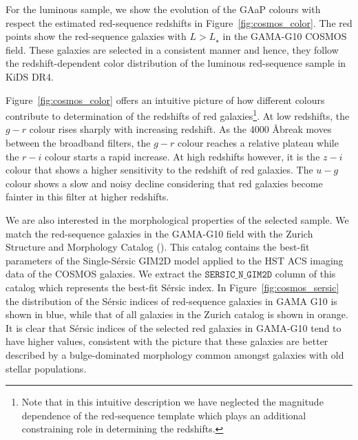 \documentclass{aa}
\numberwithin{equation}{section}
\begin{document}
{For the luminous sample, we show the evolution of the GAaP colours with respect the estimated red-sequence redshifts in Figure~\ref{fig:cosmos_color}. The red points show the red-sequence galaxies with $L>L_{\star}$ in the GAMA-G10 COSMOS field. These galaxies are selected in a consistent manner and hence, they follow the redshift-dependent color distribution of the luminous red-sequence sample in KiDS DR4. 

Figure~\ref{fig:cosmos_color} offers an intuitive picture of how different colours contribute to determination of the redshifts of red galaxies\footnote{Note that in this intuitive description we have neglected the magnitude dependence of the red-sequence template which plays an additional constraining role in determining the redshifts.}. At low redshifts, the $g-r$ colour rises sharply with increasing redshift. As the 4000 \AA break moves between the broadband filters, the $g-r$ colour reaches a relative plateau while the $r-i$ colour starts a rapid increase. At high redshifts however, it is the $z-i$ colour that shows a higher sensitivity to the redshift of red galaxies. The $u-g$ colour shows a slow and noisy decline considering that red galaxies become fainter in this filter at higher redshifts. 




We are also interested in the morphological properties of the selected sample. We match the red-sequence galaxies in the GAMA-G10 field with the Zurich Structure and Morphology Catalog (\citealt{scarlata2007, sargent2007}). This catalog contains the best-fit parameters of the Single-S\'{e}rsic GIM2D model applied to the HST ACS imaging data of the COSMOS galaxies. We extract the $\mathtt{SERSIC\_N\_GIM2D}$ column of this catalog which represents the best-fit S\'{e}rsic index. In Figure~\ref{fig:cosmos_sersic} the distribution of the S\'{e}rsic indices of red-sequence galaxies in GAMA G10 is shown in blue, while that of all galaxies in the Zurich catalog is shown in orange. It is clear that S\'{e}rsic indices of the selected red galaxies in GAMA-G10 tend to have higher values, consistent with the picture that these galaxies are better described by a bulge-dominated morphology common amongst galaxies with old stellar populations.

}
\end{document}
